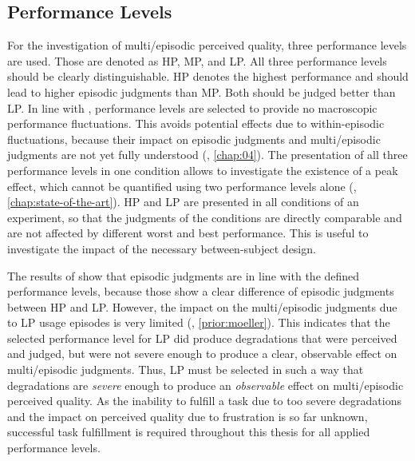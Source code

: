 \subsection{Performance Levels}
For the investigation of multi\-/episodic perceived quality, three performance levels are used.
Those are denoted as \acf{HP}, \acf{MP}, and \acf{LP}.
All three performance levels should be clearly distinguishable.
\ac{HP} denotes the highest performance and should lead to higher episodic judgments than \ac{MP}.
Both should be judged better than \ac{LP}.
In line with \citet{moller_single-call_2011}, performance levels are selected to provide no macroscopic performance fluctuations.
This avoids potential effects due to within-episodic fluctuations, because their impact on episodic judgments and multi\-/episodic judgments are not yet fully understood (\cf, \autoref{chap:04}).
The presentation of all three performance levels in one condition allows to investigate the existence of a peak effect, which cannot be quantified using two performance levels alone (\cf, \autoref{chap:state-of-the-art}).
\ac{HP} and \ac{LP} are presented in all conditions of an experiment, so that the judgments of the conditions are directly comparable and are not affected by different worst and best performance.
This is useful to investigate the impact of the necessary between-subject design.

The results of \citet{moller_single-call_2011} show that episodic judgments are in line with the defined performance levels, because those show a clear difference of episodic judgments between \ac{HP} and \ac{LP}.
However, the impact on the multi\-/episodic judgments due to \ac{LP} usage episodes is very limited (\cf, \autoref{prior:moeller}).
This indicates that the selected performance level for \ac{LP} did produce degradations that were perceived and judged, but were not severe enough to produce a clear, observable effect on multi\-/episodic judgments.
Thus, \ac{LP} must be selected in such a way that degradations are \emph{severe} enough to produce an \emph{observable} effect on multi\-/episodic perceived quality.
As the inability to fulfill a task due to too severe degradations and the impact on perceived quality due to frustration is so far unknown, successful task fulfillment is required throughout this thesis for all applied performance levels.

